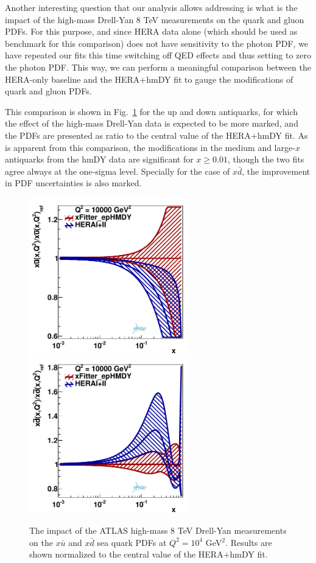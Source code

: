 Another interesting question that our analysis allows addressing is what is
the impact of the high-mass Drell-Yan 8 TeV measurements on the quark and gluon
PDFs.
%
For this purpose, and since HERA data alone (which should be used as benchmark for
this comparison) does not have sensitivity to the photon PDF,
we have repeated our fits this time switching off QED effects and thus setting to zero
the photon PDF.
%
This way, we can perform a meaningful comparison between the HERA-only baseline and the
HERA+hmDY fit to gauge the modifications of quark and gluon PDFs.

This comparison is shown in Fig.~\ref{fig:QCDfit} for the up and down antiquarks,
for which the effect of the high-mass
Drell-Yan data is expected to be more marked, and the PDFs are presented
as ratio to the central value of the HERA+hmDY fit.
%
As is apparent from this comparison, the modifications in the medium and large-$x$
antiquarks from the hmDY data are significant for $x\ge 0.01$, though the two fits
agree always at the one-sigma level.
%
Specially for the case of $x\bar{d}$, the improvement in PDF uncertainties
is also marked.

\begin{figure}[h]
\centering
\includegraphics[width=7cm]{figs/q2_10000_pdf_ubar_ratio}
\includegraphics[width=7cm]{figs/q2_10000_pdf_dbar_ratio} 
\caption{The impact of the ATLAS high-mass 8 TeV Drell-Yan measurements
  on the $x\bar{u}$ and $x\bar{d}$ sea quark PDFs at $Q^2=10^4$ GeV$^2$.
  Results are shown normalized to the central value of the HERA+hmDY fit.
}
\label{fig:QCDfit}
\end{figure}

